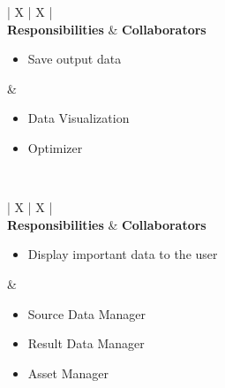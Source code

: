 \vspace{1.5em}

\noindent
\begin{tabularx}{\textwidth}{| X | X |}
    \hline
     \\
    \hline
    \textbf{Responsibilities} & \textbf{Collaborators} \\
    \hline
    \begin{itemize}[leftmargin=*, nosep, before=\vspace{-0.2\baselineskip}]
        \item Save output data
    \end{itemize} & 
    \begin{itemize}[leftmargin=*, nosep, before=\vspace{-0.2\baselineskip}]
        \item Data Visualization
        \item Optimizer
    \end{itemize} \\
    \hline
\end{tabularx}

\vspace{1.5em}

\noindent
\begin{tabularx}{\textwidth}{| X | X |}
    \hline
     \\
    \hline
    \textbf{Responsibilities} & \textbf{Collaborators} \\
    \hline
    \begin{itemize}[leftmargin=*, nosep, before=\vspace{-0.2\baselineskip}]
        \item Display important data to the user
    \end{itemize} & 
    \begin{itemize}[leftmargin=*, nosep, before=\vspace{-0.2\baselineskip}]
        \item Source Data Manager
        \item Result Data Manager
        \item Asset Manager
    \end{itemize} \\
    \hline
\end{tabularx}

